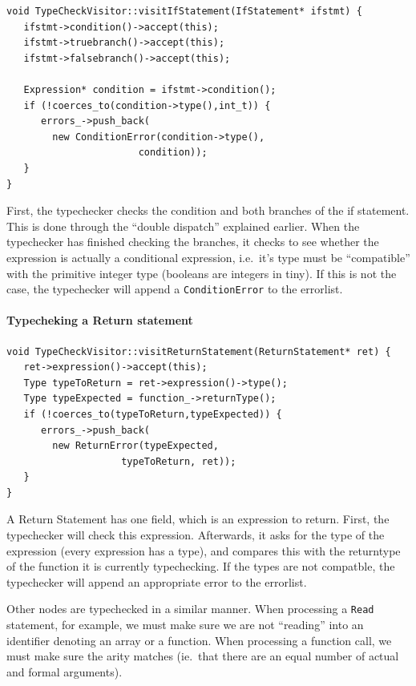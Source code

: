 \documentclass[a4paper]{article}
\begin{document}
\begin{verbatim}
void TypeCheckVisitor::visitIfStatement(IfStatement* ifstmt) {
   ifstmt->condition()->accept(this);
   ifstmt->truebranch()->accept(this);
   ifstmt->falsebranch()->accept(this);

   Expression* condition = ifstmt->condition();
   if (!coerces_to(condition->type(),int_t)) {
      errors_->push_back(
        new ConditionError(condition->type(),
	                   condition));
   }
}
\end{verbatim}

First, the typechecker checks the condition and both branches of the if
statement. This is done through the ``double dispatch'' explained earlier.
When the typechecker has finished checking the branches, it checks to see
whether the expression is actually a conditional expression, i.e.~it's type
must be ``compatible'' with the primitive integer type (booleans are integers
in tiny). If this is not the case, the typechecker will append a
\texttt{ConditionError} to the errorlist.

\paragraph{Typecheking a Return statement\\}

\begin{verbatim}
void TypeCheckVisitor::visitReturnStatement(ReturnStatement* ret) {
   ret->expression()->accept(this);
   Type typeToReturn = ret->expression()->type();
   Type typeExpected = function_->returnType();
   if (!coerces_to(typeToReturn,typeExpected)) {
      errors_->push_back(
        new ReturnError(typeExpected,
	                typeToReturn, ret));
   }
}
\end{verbatim}

A Return Statement has one field, which is an expression to return. First, the
typechecker will check this expression. Afterwards, it asks for the type of
the expression (every expression has a type), and compares this with the
returntype of the function it is currently typechecking. If the types are not
compatble, the typechecker will append an appropriate error to the errorlist.

Other nodes are typechecked in a similar manner. When processing a
\texttt{Read} statement, for example, we must make sure we are not ``reading''
into an identifier denoting an array or a function. When processing a function
call, we must make sure the arity matches (ie.~that there are an equal number
of actual and formal arguments).
\end{document}
